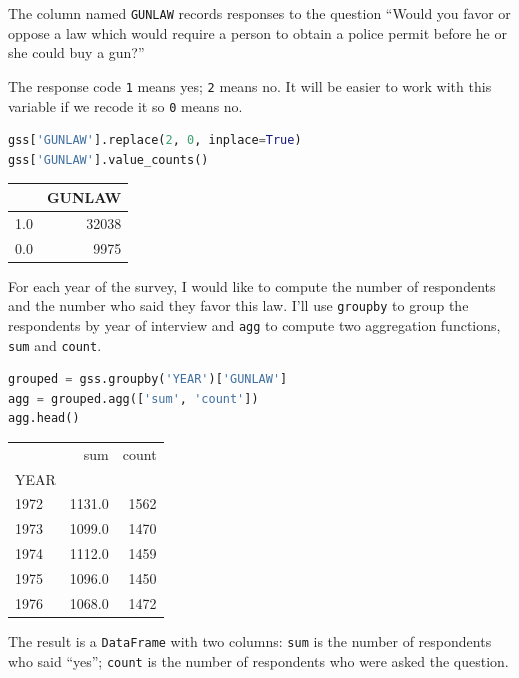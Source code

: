 The column named \passthrough{\lstinline!GUNLAW!} records responses to
the question ``Would you favor or oppose a law which would require a
person to obtain a police permit before he or she could buy a gun?''

The response code \passthrough{\lstinline!1!} means yes;
\passthrough{\lstinline!2!} means no. It will be easier to work with
this variable if we recode it so \passthrough{\lstinline!0!} means no.

\begin{lstlisting}[language=Python,style=source]
gss['GUNLAW'].replace(2, 0, inplace=True)
gss['GUNLAW'].value_counts()
\end{lstlisting}

\begin{tabular}{lr}
\toprule
{} &  GUNLAW \\
\midrule
1.0 &   32038 \\
0.0 &    9975 \\
\bottomrule
\end{tabular}

For each year of the survey, I would like to compute the number of
respondents and the number who said they favor this law. I'll use
\passthrough{\lstinline!groupby!} to group the respondents by year of
interview and \passthrough{\lstinline!agg!} to compute two aggregation
functions, \passthrough{\lstinline!sum!} and
\passthrough{\lstinline!count!}.

\begin{lstlisting}[language=Python,style=source]
grouped = gss.groupby('YEAR')['GUNLAW']
agg = grouped.agg(['sum', 'count'])
agg.head()
\end{lstlisting}

\begin{tabular}{lrr}
\toprule
{} &     sum &  count \\
YEAR &         &        \\
\midrule
1972 &  1131.0 &   1562 \\
1973 &  1099.0 &   1470 \\
1974 &  1112.0 &   1459 \\
1975 &  1096.0 &   1450 \\
1976 &  1068.0 &   1472 \\
\bottomrule
\end{tabular}

The result is a \passthrough{\lstinline!DataFrame!} with two columns:
\passthrough{\lstinline!sum!} is the number of respondents who said
``yes''; \passthrough{\lstinline!count!} is the number of respondents
who were asked the question.

